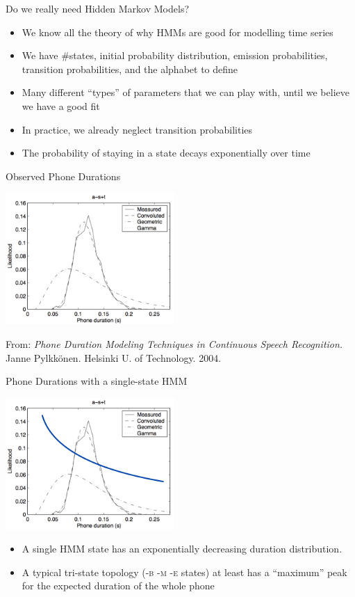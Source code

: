 \begin{frame}{Do we really need Hidden Markov Models?}
  \begin{itemize}
  \item We know all the theory of why HMMs are good for modelling time series
  \item We have \#states, initial probability distribution, emission probabilities,
    transition probabilities, and the alphabet to define
  \item Many different ``types'' of parameters that we can play with, until we believe we have a good fit
  \item In practice, we already neglect transition probabilities
  \item The probability of staying in a state decays exponentially over time
  \end{itemize}
\end{frame}

\begin{frame}{Observed Phone Durations}
  \begin{center}
    \includegraphics[height=50mm]{figures/durations}
  \end{center}
  \tiny From: \textit{Phone Duration Modeling Techniques in Continuous Speech 
    Recognition.} Janne Pylkk\"onen. Helsinki U. of Technology. 2004.
\end{frame}

\begin{frame}{Phone Durations with a single-state HMM}
  \begin{center}
    \includegraphics[height=50mm]{figures/durations3}
  \end{center}
  \begin{itemize}
  \item A single HMM state has an exponentially decreasing duration distribution.
  \item A typical tri-state topology (\textsc{-b -m -e} states) at least has a ``maximum'' peak for
    the expected duration of the whole phone
  \end{itemize}
\end{frame}

